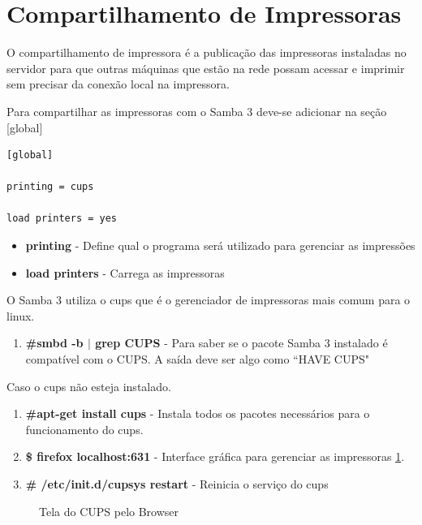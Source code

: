 \pagebreak

\section{Compartilhamento de Impressoras}

O compartilhamento de impressora é a publicação das impressoras instaladas no servidor para que outras máquinas que estão na rede possam acessar e imprimir sem precisar da conexão local na impressora.

Para compartilhar as impressoras com o Samba 3 deve-se adicionar na seção [global]\\

\begin{lstlisting}	
[global]

printing = cups

load printers = yes	
\end{lstlisting}

\begin{itemize}
	\item \textbf{printing} - Define qual o programa será utilizado para gerenciar as impressões 
	\item \textbf{load printers} - Carrega as impressoras
\end{itemize}

O Samba 3 utiliza o cups que é o gerenciador de impressoras mais comum para o linux.

\begin{enumerate}
	\item \textbf{\#smbd -b $|$ grep CUPS} - Para saber se o pacote Samba 3 instalado é compatível com o CUPS. A saída deve ser algo como ``HAVE CUPS"
\end{enumerate}

Caso o cups não esteja instalado.

\begin{enumerate}
	\item \textbf{\#apt-get install cups} - Instala todos os pacotes necessários para o funcionamento do cups.
	\item \textbf{\$ firefox localhost:631} - Interface gráfica para gerenciar as impressoras \ref{cups}.
	\item \textbf{\# /etc/init.d/cupsys restart} - Reinicia o serviço do cups
\end{enumerate}

\begin{figure}[ht]
   	\centering
   	\caption{Tela do CUPS pelo Browser}
    \label{cups}
\end{figure}

